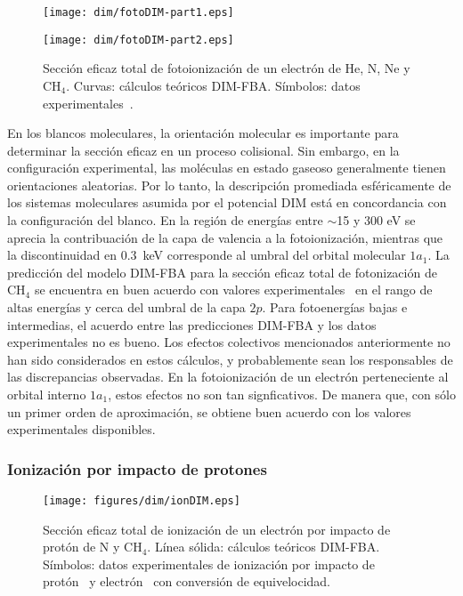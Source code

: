 \begin{figure}
\centering
\texttt{[image: dim/fotoDIM-part1.eps]} 

\vspace{-1.15cm}
\texttt{[image: dim/fotoDIM-part2.eps]}
\caption[Fotoionización de He, N, Ne y CH$_4$.]
{Sección eficaz total de fotoionización de un electrón de He, N, Ne y 
CH$_4$. Curvas: cálculos teóricos DIM-FBA. Símbolos: 
datos experimentales~\cite{Samson:90,Henke:93,Stolte:16,Samson:02,
Lukirskii:64,Henke:82,Samson:89}.}
\label{fig:photoDIM}
\end{figure}

En los blancos moleculares, la orientación molecular es importante para 
determinar la sección eficaz en un proceso colisional. Sin embargo, en 
la configuración experimental, las moléculas en estado gaseoso 
generalmente tienen orientaciones aleatorias. Por lo tanto, la 
descripción promediada esféricamente de los sistemas moleculares asumida 
por el potencial DIM está en concordancia con la configuración del 
blanco. En la región de energías entre $\sim$15 y 300 eV se aprecia la 
contribuación de la capa de valencia a la fotoionización, mientras que 
la discontinuidad en $0.3$~keV corresponde al umbral del orbital 
molecular $1a_1$. La predicción del modelo DIM-FBA para la sección 
eficaz total de fotonización de CH$_4$ se encuentra en buen acuerdo con 
valores experimentales~\cite{Lukirskii:64,Henke:82,Samson:89} en el 
rango de altas energías y cerca del umbral de la capa $2p$. Para 
fotoenergías bajas e intermedias, el acuerdo entre las predicciones 
DIM-FBA y los datos experimentales no es bueno. 
Los efectos colectivos mencionados anteriormente no han sido 
considerados en estos cálculos, y probablemente sean los responsables de 
las discrepancias observadas. En la fotoionización de un electrón 
perteneciente al orbital interno $1a_1$, estos efectos no son tan 
signficativos. De manera que, con sólo un primer orden de aproximación, 
se obtiene buen acuerdo con los valores experimentales disponibles. 

\subsubsection{Ionización por impacto de protones}

\begin{figure}[t]
\centering
\texttt{[image: figures/dim/ionDIM.eps]}
\caption[Ionización por impacto de protón de N y CH$_4$.]
{Sección eficaz total de ionización de un electrón por impacto de protón 
de N y CH$_4$. Línea sólida: cálculos teóricos DIM-FBA. 
Símbolos: datos experimentales de ionización por impacto de 
protón~\cite{Rudd:83,Rudd:85} y electrón~\cite{Brook:78} con conversión 
de equivelocidad.}
\label{fig:iondim}
\end{figure}

